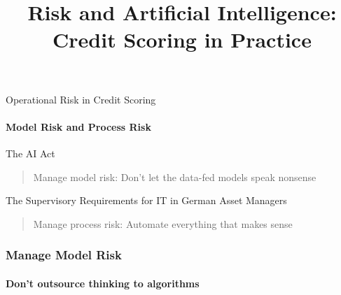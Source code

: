 

\title{Risk and Artificial Intelligence: Credit Scoring in Practice}

\maketitle

\begin{frame}{Operational Risk in Credit Scoring}
    \framesubtitle{Model Risk and Process Risk}
    \begin{block}{The AI Act}
        \begin{quote}
            Manage model risk: Don't let the data-fed models speak nonsense
        \end{quote}
    \end{block}
    \begin{block}{The Supervisory Requirements for IT in German Asset Managers}
        \begin{quote}
            Manage process risk: Automate everything that makes sense
        \end{quote}
    \end{block}
\end{frame}

\begin{frame}
\frametitle{Manage Model Risk}
\framesubtitle{Don't outsource thinking to algorithms}
    \begin{center}
    \end{center}
\end{frame}


